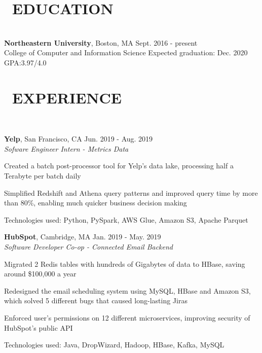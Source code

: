 \documentclass[11pt]{res}
\newcommand{\sectionunderline}{\vspace{-3mm}\hrulefill\\}
\newcommand{\listingtab}{\tabto{3.5cm}}
\newcommand{\newsect}[1]{\section{\Large \bf #1}}
\newcommand{\email}[1]{\faEnvelope\hspace{1mm} \href{mailto:#1}{#1}}
\newcommand{\phone}[1]{\faMobilePhone\hspace{1mm} #1}
\newcommand{\github}[1]{\faGithubAlt\hspace{1mm} \href{https://github.com/#1}{#1}}
\newcommand{\linkedin}[1]{\faLinkedinSquare\hspace{1mm} \href{https://linkedin.com/in/#1}{#1}}
\begin{document}
\address{
  \large\phone{(802) 503-5089}\:
  \large{$\bullet$}
  \large\email{derekpham67@gmail.com}\:
  \large{$\bullet$}
  \large\github{derekpham}\:
  \large{$\bullet$}
  \large\linkedin{derek-pham97}\\
  \normalsize Availability for internships/co-ops: Jan. - Aug. 2020
}

\begin{resume}
  \newsect{\faGraduationCap\ EDUCATION}{
    \sectionunderline{
      {\bf Northeastern University}, Boston, MA \hfill Sept. 2016 - present\\
      College of Computer and Information Science} \hfill Expected graduation: Dec. 2020\\
    GPA:\listingtab \hfill 3.97/4.0
  }

  \newsect{\faUsers\ EXPERIENCE}{
    \sectionunderline{
      {\bf Yelp}, San Francisco, CA \hfill Jun. 2019 - Aug. 2019\\
      {\it Sofware Engineer Intern - Metrics Data}
      \begin{itemize}
        {\item Created a batch post-processor tool for Yelp's data lake, processing half a Terabyte per batch daily}
        {\item Simplified Redshift and Athena query patterns and improved query time by more than 80\%, enabling much quicker business decision making}
        {\item Technologies used: Python, PySpark, AWS Glue, Amazon S3, Apache Parquet}
      \end{itemize}

      {\bf HubSpot}, Cambridge, MA \hfill Jan. 2019 - May. 2019\\
      {\it Software Developer Co-op - Connected Email Backend}
      \begin{itemize}
        {\item Migrated 2 Redis tables with hundreds of Gigabytes of data to HBase, saving around \$100,000 a year}
        {\item Redesigned the email scheduling system using MySQL, HBase and Amazon S3, which solved 5 different bugs that caused long-lasting Jiras}
        {\item Enforced user's permissions on 12 different microservices, improving security of HubSpot's public API}
        {\item Technologies used: Java, DropWizard, Hadoop, HBase, Kafka, MySQL}
      \end{itemize}

}}
\end{resume}
\end{document}

